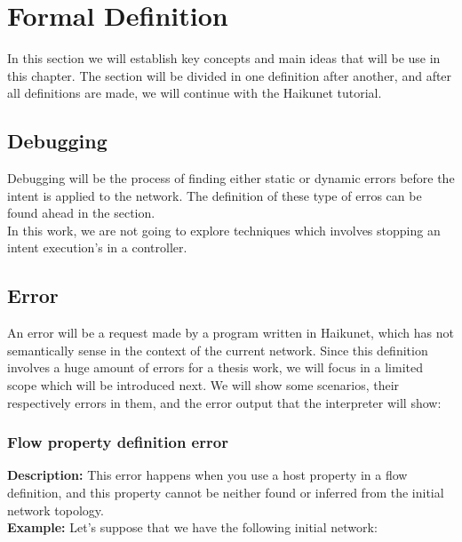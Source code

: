 \section{Formal Definition}

In this section we will establish key concepts and main ideas that will be use in this chapter. The section will be divided in one definition after another, and after all definitions are made, we will continue with the Haikunet tutorial.\\

\subsection{Debugging}

Debugging will be the process of finding either static or dynamic errors before the intent is applied to the network. The definition of these type of erros can be found ahead in the section.\\
In this work, we are not going to explore techniques which involves stopping an intent execution's in a controller. 

\subsection{Error}

An error will be a request made by a program written in Haikunet, which has not semantically sense in the context of the current network. Since this definition involves a huge amount of errors for a thesis work, we will focus in a limited scope which will be introduced next. We will show some scenarios, their respectively errors in them, and the error output that the interpreter will show:

\subsubsection{Flow property definition error}

\textbf{Description:} This error happens when you use a host property in a flow definition, and this property cannot be neither found or inferred from the initial network topology. \\

\textbf{Example:} Let's suppose that we have the following initial network:

